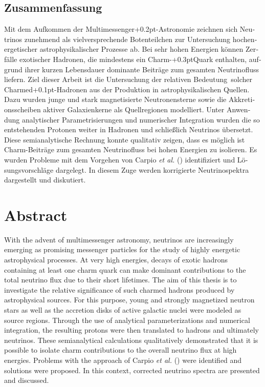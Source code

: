 \begin{otherlanguage}{ngerman}
	\chapter*{Zusammenfassung}

	Mit dem Aufkommen der Multimessenger{\kern+0.2pt}-Astronomie zeichnen sich Neutrinos zunehmend als vielversprechende
	Botenteilchen zur Untersuchung hochenergetischer astrophysikalischer Prozesse ab. Bei sehr hohen Energien können Zerfälle
	exotischer Hadronen, die mindestens ein Charm-{\kern+0.3pt}Quark enthalten, aufgrund ihrer kurzen Lebensdauer dominante
	Beiträge zum gesamten Neutrinofluss liefern. Ziel dieser Arbeit ist die Untersuchung der relativen Bedeutung~solcher
	Charmed{\kern+0.1pt}-Hadronen aus der Produktion in astrophysikalischen Quellen. Dazu wurden junge und
	stark magnetisierte Neutronensterne sowie die Akkretionsscheiben \mbox{aktiver} Galaxienkerne als Quellregionen modelliert.
	Unter Anwendung analytischer Parametrisierungen und numerischer Integration wurden die so entstehenden Protonen
	weiter in Hadronen und schließlich Neutrinos übersetzt. Diese semianalytische Rechnung konnte qualitativ
	zeigen, dass es möglich ist Charm-Beiträge zum gesamten Neutrinofluss bei hohen Energien zu isolieren. Es wurden
	Probleme mit dem Vorgehen von Carpio \emph{et al.} () identifiziert und Lösungsvorschläge
	dargelegt. In diesem Zuge werden korrigierte Neutrinospektra dargestellt und diskutiert.

\end{otherlanguage}



{\let\clearpage\relax\chapter*{Abstract}\label{ch:abstract}}

With the advent of multimessenger astronomy, neutrinos are increasingly emerging as promising messenger particles for the
study of highly energetic astrophysical processes. At very high energies, decays of exotic hadrons containing at least one
charm quark can make dominant contributions to the total neutrino flux due to their short lifetimes. The aim of this
thesis is to investigate the relative significance of such charmed hadrons produced by astrophysical sources.
For this purpose, young and strongly magnetized neutron stars as well as the accretion disks of active galactic nuclei were
modeled as source regions. Through the use of analytical parameterizations and numerical integration, the resulting protons
were then translated to hadrons and ultimately neutrinos. These semianalytical calculations qualitatively
demonstrated that it is possible to isolate charm contributions to the overall neutrino flux at high energies. Problems
with the approach of Carpio \emph{et al.} () were identified and solutions were proposed.
In this context, corrected neutrino spectra are presented and discussed.
